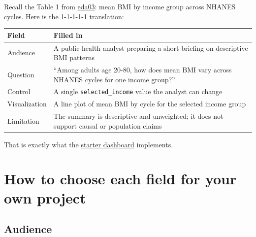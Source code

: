 \documentclass[
  letterpaper,
  DIV=11,
  numbers=noendperiod,
  oneside]{scrreprt}
\begin{document}

Recall the Table 1 from
\hyperref[worked-example-eda-and-table-1]{eda03}: mean BMI by income
group across NHANES cycles. Here is the 1-1-1-1-1 translation:

\begin{longtable}[]{@{}
  >{\raggedright\arraybackslash}p{}
  >{\raggedright\arraybackslash}p{}@{}}
\toprule\noalign{}
\begin{minipage}[b]{\linewidth}\raggedright
Field
\end{minipage} & \begin{minipage}[b]{\linewidth}\raggedright
Filled in
\end{minipage} \\
\midrule\noalign{}
\endhead
\bottomrule\noalign{}
\endlastfoot
Audience & A public-health analyst preparing a short briefing on
descriptive BMI patterns \\
Question & ``Among adults age 20-80, how does mean BMI vary across
NHANES cycles for one income group?'' \\
Control & A single \texttt{selected\_income} value the analyst can
change \\
Visualization & A line plot of mean BMI by cycle for the selected income
group \\
Limitation & The summary is descriptive and unweighted; it does not
support causal or population claims \\
\end{longtable}

That is exactly what the \href{dash03-starter-dashboard.qmd}{starter
dashboard} implements.

\section*{How to choose each field for your own
project}\label{how-to-choose-each-field-for-your-own-project}


\subsection*{Audience}\label{audience}
\end{document}
